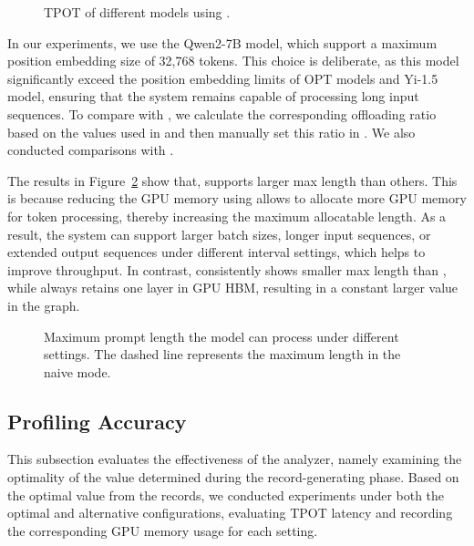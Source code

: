 \begin{figure}[t]
    \centering
    \resizebox{0.5\columnwidth}{!}{
 }
    \caption{TPOT of different models using \sys.}
    \label{fig:eval3}
\end{figure}

In our experiments, we use the Qwen2-7B model, which support a maximum position embedding size of 32,768 tokens. 
This choice is deliberate, 
as this model significantly exceed the position embedding limits of OPT models and Yi-1.5 model, 
ensuring that the system remains capable of processing long input sequences. 
To compare with \flexgen, we calculate the corresponding offloading ratio based on the \interval values used in \sys and then manually set this ratio in \flexgen. 
We also conducted comparisons with \deepspeed.

The results in Figure~\ref{fig:eval4} show that, 
\sys supports larger max length than others. 
This is because reducing the GPU memory using allows \sys to allocate more GPU memory for token processing, thereby increasing the maximum allocatable length. 
As a result, the system can support larger batch sizes, 
longer input sequences, or extended output sequences under different interval settings, which helps to improve throughput. 
In contrast, \flexgen consistently shows smaller max length than \sys, while \deepspeed always retains one layer in GPU HBM, 
resulting in a constant larger value in the graph.

\begin{figure}[t]
    \centering
    \resizebox{\columnwidth}{!}{
 }
    \caption{Maximum prompt length the model can process under different \interval settings.
 The dashed line represents the maximum length in the naive mode.}
    \label{fig:eval4}
\end{figure}



\subsection{Profiling Accuracy}

This subsection evaluates the effectiveness of the \interval analyzer, namely examining the optimality of the \interval value determined during the record-generating phase. 
Based on the optimal \interval value from the records, we conducted experiments under both the optimal and alternative \interval configurations, 
evaluating TPOT latency and recording the corresponding GPU memory usage for each setting.

